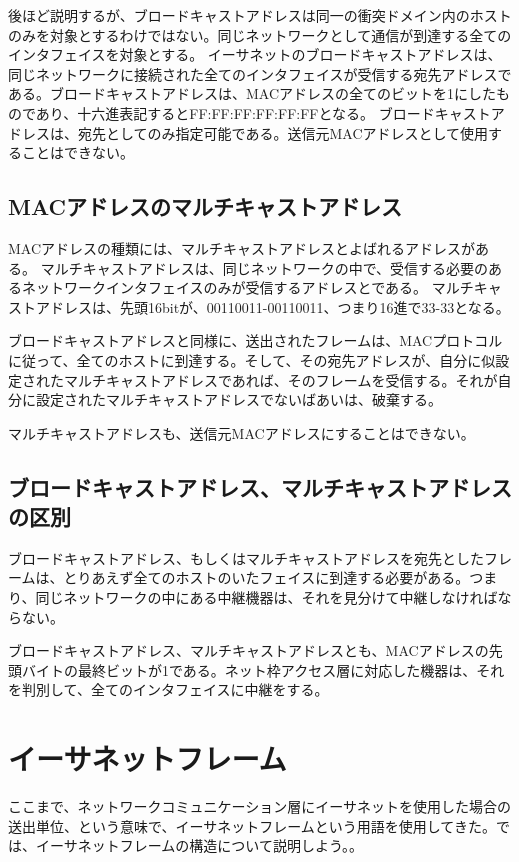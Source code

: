 後ほど説明するが、ブロードキャストアドレスは同一の衝突ドメイン内のホストのみを対象とするわけではない。同じネットワークとして通信が到達する全てのインタフェイスを対象とする。
イーサネットのブロードキャストアドレスは、同じネットワークに接続された全てのインタフェイスが受信する宛先アドレスである。ブロードキャストアドレスは、MACアドレスの全てのビットを1にしたものであり、十六進表記するとFF:FF:FF:FF:FF:FFとなる。
ブロードキャストアドレスは、宛先としてのみ指定可能である。送信元MACアドレスとして使用することはできない。

\subsection{MACアドレスのマルチキャストアドレス}
MACアドレスの種類には、マルチキャストアドレスとよばれるアドレスがある。
マルチキャストアドレスは、同じネットワークの中で、受信する必要のあるネットワークインタフェイスのみが受信するアドレスとである。
マルチキャストアドレスは、先頭16bitが、00110011-00110011、つまり16進で33-33となる。

ブロードキャストアドレスと同様に、送出されたフレームは、MACプロトコルに従って、全てのホストに到達する。そして、その宛先アドレスが、自分に似設定されたマルチキャストアドレスであれば、そのフレームを受信する。それが自分に設定されたマルチキャストアドレスでないばあいは、破棄する。

マルチキャストアドレスも、送信元MACアドレスにすることはできない。

\subsection{ブロードキャストアドレス、マルチキャストアドレスの区別}
ブロードキャストアドレス、もしくはマルチキャストアドレスを宛先としたフレームは、とりあえず全てのホストのいたフェイスに到達する必要がある。つまり、同じネットワークの中にある中継機器は、それを見分けて中継しなければならない。

ブロードキャストアドレス、マルチキャストアドレスとも、MACアドレスの先頭バイトの最終ビットが1である。ネット枠アクセス層に対応した機器は、それを判別して、全てのインタフェイスに中継をする。

\section{イーサネットフレーム}

ここまで、ネットワークコミュニケーション層にイーサネットを使用した場合の送出単位、という意味で、イーサネットフレームという用語を使用してきた。では、イーサネットフレームの構造について説明しよう。。

